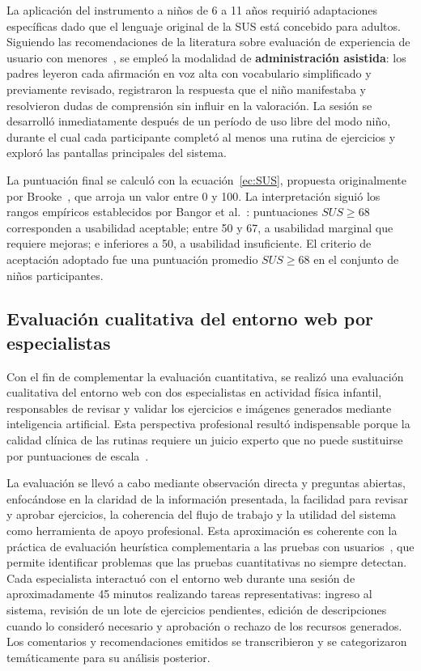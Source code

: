 				La aplicación del instrumento a niños de 6 a 11 años requirió adaptaciones específicas dado que el lenguaje original de la SUS está concebido para adultos. Siguiendo las recomendaciones de la literatura sobre evaluación de experiencia de usuario con menores~\cite{Hourcade2015}, se empleó la modalidad de \textbf{administración asistida}: los padres leyeron cada afirmación en voz alta con vocabulario simplificado y previamente revisado, registraron la respuesta que el niño manifestaba y resolvieron dudas de comprensión sin influir en la valoración. La sesión se desarrolló inmediatamente después de un período de uso libre del modo niño, durante el cual cada participante completó al menos una rutina de ejercicios y exploró las pantallas principales del sistema.
				
				La puntuación final se calculó con la ecuación~\eqref{ec:SUS}, propuesta originalmente por Brooke~\cite{Brooke1996}, que arroja un valor entre 0 y 100. La interpretación siguió los rangos empíricos establecidos por Bangor et al.~\cite{Bangor2009}: puntuaciones $SUS \geq 68$ corresponden a usabilidad aceptable; entre 50 y 67, a usabilidad marginal que requiere mejoras; e inferiores a 50, a usabilidad insuficiente. El criterio de aceptación adoptado fue una puntuación promedio $SUS \geq 68$ en el conjunto de niños participantes.
		
			\subsection{Evaluación cualitativa del entorno web por especialistas}
				Con el fin de complementar la evaluación cuantitativa, se realizó una evaluación cualitativa del entorno web con dos especialistas en actividad física infantil, responsables de revisar y validar los ejercicios e imágenes generados mediante inteligencia artificial. Esta perspectiva profesional resultó indispensable porque la calidad clínica de las rutinas requiere un juicio experto que no puede sustituirse por puntuaciones de escala~\cite{Yim2024,Zaleski2026}.
				
				La evaluación se llevó a cabo mediante observación directa y preguntas abiertas, enfocándose en la claridad de la información presentada, la facilidad para revisar y aprobar ejercicios, la coherencia del flujo de trabajo y la utilidad del sistema como herramienta de apoyo profesional. Esta aproximación es coherente con la práctica de evaluación heurística complementaria a las pruebas con usuarios~\cite{Nielsen1994}, que permite identificar problemas que las pruebas cuantitativas no siempre detectan. Cada especialista interactuó con el entorno web durante una sesión de aproximadamente 45 minutos realizando tareas representativas: ingreso al sistema, revisión de un lote de ejercicios pendientes, edición de descripciones cuando lo consideró necesario y aprobación o rechazo de los recursos generados. Los comentarios y recomendaciones emitidos se transcribieron y se categorizaron temáticamente para su análisis posterior.
				
